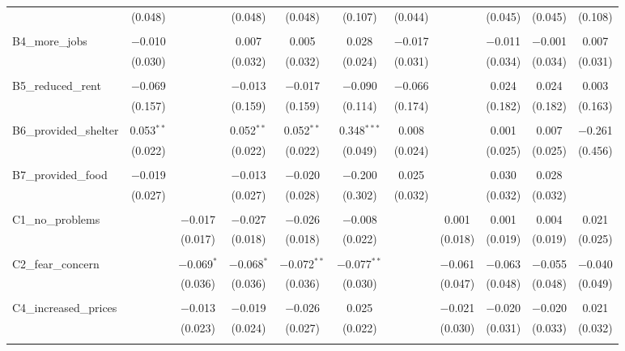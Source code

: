 \begin{table}[H]
\begin{tabular}{@{\extracolsep{4pt}}lcccccccccc}
  & (0.048) &  & (0.048) & (0.048) & (0.107) & (0.044) &  & (0.045) & (0.045) & (0.108) \\ 
  & & & & & & & & & & \\ 
 B4\_more\_jobs & $-$0.010 &  & 0.007 & 0.005 & 0.028 & $-$0.017 &  & $-$0.011 & $-$0.001 & 0.007 \\ 
  & (0.030) &  & (0.032) & (0.032) & (0.024) & (0.031) &  & (0.034) & (0.034) & (0.031) \\ 
  & & & & & & & & & & \\ 
 B5\_reduced\_rent & $-$0.069 &  & $-$0.013 & $-$0.017 & $-$0.090 & $-$0.066 &  & 0.024 & 0.024 & 0.003 \\ 
  & (0.157) &  & (0.159) & (0.159) & (0.114) & (0.174) &  & (0.182) & (0.182) & (0.163) \\ 
  & & & & & & & & & & \\ 
 B6\_provided\_shelter & 0.053$^{**}$ &  & 0.052$^{**}$ & 0.052$^{**}$ & 0.348$^{***}$ & 0.008 &  & 0.001 & 0.007 & $-$0.261 \\ 
  & (0.022) &  & (0.022) & (0.022) & (0.049) & (0.024) &  & (0.025) & (0.025) & (0.456) \\ 
  & & & & & & & & & & \\ 
 B7\_provided\_food & $-$0.019 &  & $-$0.013 & $-$0.020 & $-$0.200 & 0.025 &  & 0.030 & 0.028 &  \\ 
  & (0.027) &  & (0.027) & (0.028) & (0.302) & (0.032) &  & (0.032) & (0.032) &  \\ 
  & & & & & & & & & & \\ 
 C1\_no\_problems &  & $-$0.017 & $-$0.027 & $-$0.026 & $-$0.008 &  & 0.001 & 0.001 & 0.004 & 0.021 \\ 
  &  & (0.017) & (0.018) & (0.018) & (0.022) &  & (0.018) & (0.019) & (0.019) & (0.025) \\ 
  & & & & & & & & & & \\ 
 C2\_fear\_concern &  & $-$0.069$^{*}$ & $-$0.068$^{*}$ & $-$0.072$^{**}$ & $-$0.077$^{**}$ &  & $-$0.061 & $-$0.063 & $-$0.055 & $-$0.040 \\ 
  &  & (0.036) & (0.036) & (0.036) & (0.030) &  & (0.047) & (0.048) & (0.048) & (0.049) \\ 
  & & & & & & & & & & \\ 
 C4\_increased\_prices &  & $-$0.013 & $-$0.019 & $-$0.026 & 0.025 &  & $-$0.021 & $-$0.020 & $-$0.020 & 0.021 \\ 
  &  & (0.023) & (0.024) & (0.027) & (0.022) &  & (0.030) & (0.031) & (0.033) & (0.032) \\ 
  & & & & & & & & & & \\ 

\end{tabular}
\end{table}
